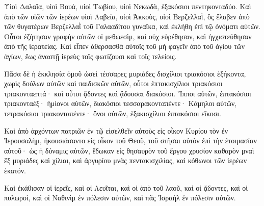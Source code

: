 {Υἱοὶ Δαλαΐα, υἱοὶ Βουὰ, υἱοὶ Τωβίου, υἱοὶ Νεκωδὰ, ἑξακόσιοι πεντηκονταδύο.
Καὶ ἀπὸ τῶν υἱῶν τῶν ἱερέων υἱοὶ Λαβεία, υἱοὶ Ἀκκοὺς, υἱοὶ Βερζελλαῒ, ὃς ἔλαβεν ἀπὸ τῶν θυγατέρων Βερζελλαῒ τοῦ Γαλααδίτου γυναῖκα, καὶ ἐκλήθη ἐπὶ τῷ ὀνόματι αὐτῶν.
Οὗτοι ἐζήτησαν γραφὴν αὐτῶν οἱ μεθωεσὶμ, καὶ οὐχ εὑρέθησαν, καὶ ἠγχιστεύθησαν ἀπὸ τῆς ἱερατείας.
Καὶ εἶπεν ἀθερσασθὰ αὐτοῖς τοῦ μὴ φαγεῖν ἀπὸ τοῦ ἁγίου τῶν ἁγίων, ἕως ἀναστῇ ἱερεὺς τοῖς φωτίζουσι καὶ τοῖς τελείοις.
\par }{\PP {}Πᾶσα δὲ ἡ ἐκκλησία ὁμοῦ ὡσεὶ τέσσαρες μυριάδες δισχίλιοι τριακόσιοι ἑξήκοντα,
χωρὶς δούλων αὐτῶν καὶ παιδισκῶν αὐτῶν, οὗτοι ἑπτακισχίλιοι τριακόσιοι τριακονταεπτά· καὶ οὗτοι ᾄδοντες καὶ ᾄδουσαι διακόσιοι.
Ἵπποι αὐτῶν, ἑπτακόσιοι τριακονταέξ· ἡμίονοι αὐτῶν, διακόσιοι τεσσαρακονταπέντε·
Κάμηλοι αὐτῶν, τετρακόσιοι τριακονταπέντε· ὄνοι αὐτῶν, ἑξακισχίλιοι ἑπτακόσιοι εἴκοσι.
\par }{\PP {}Καὶ ἀπὸ ἀρχόντων πατριῶν ἐν τῷ εἰσελθεῖν αὐτοὺς εἰς οἶκον Κυρίου τὸν ἐν Ἱερουσαλὴμ, ἡκουσιάσαντο εἰς οἶκον τοῦ Θεοῦ, τοῦ στῆσαι αὐτὸν ἐπὶ τὴν ἑτοιμασίαν αὐτοῦ·
ὡς ἡ δύναμις αὐτῶν, ἔδωκαν εἰς θησαυρὸν τοῦ ἔργου χρυσίον καθαρὸν μναὶ ἓξ μυριάδες καὶ χίλιαι, καὶ ἀργυρίου μνὰς πεντακισχιλίας, καὶ κόθωνοι τῶν ἱερέων ἑκατόν.
\par }{\PP {}Καὶ ἐκάθισαν οἱ ἱερεῖς, καὶ οἱ Λευῖται, καὶ οἱ ἀπὸ τοῦ λαοῦ, καὶ οἱ ᾄδοντες, καὶ οἱ πυλωροὶ, καὶ οἱ Ναθινὶμ ἐν πόλεσιν αὐτῶν, καὶ πᾶς Ἰσραὴλ ἐν πόλεσιν αὐτῶν.

}
